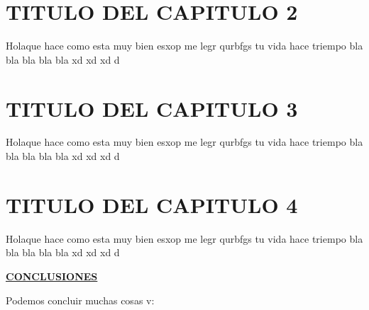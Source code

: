 \documentclass[a4paper, 12pt]{report}
\begin{document}
\chapter{TITULO DEL CAPITULO 2}
\vspace*{-2em}
\begin{justify}
Holaque hace como esta muy bien esxop me legr qurbfgs tu vida hace triempo bla bla bla bla bla xd xd xd d
\end{justify}

\vspace*{5em}
\chapter{TITULO DEL CAPITULO 3}
\vspace*{-2em}
\begin{justify}
Holaque hace como esta muy bien esxop me legr qurbfgs tu vida hace triempo bla bla bla bla bla xd xd xd d
\end{justify}

\vspace*{5em}
\chapter{TITULO DEL CAPITULO 4}
\vspace*{-2em}
\begin{justify}
Holaque hace como esta muy bien esxop me legr qurbfgs tu vida hace triempo bla bla bla bla bla xd xd xd d
\end{justify}



\newpage
\vspace*{6em}
\begin{center}
{\bf{\large{\underline{CONCLUSIONES}}}}
\end{center}
\begin{justify}
Podemos concluir muchas cosas v:
\end{justify}



\vspace*{6em}
	
\end{document}
